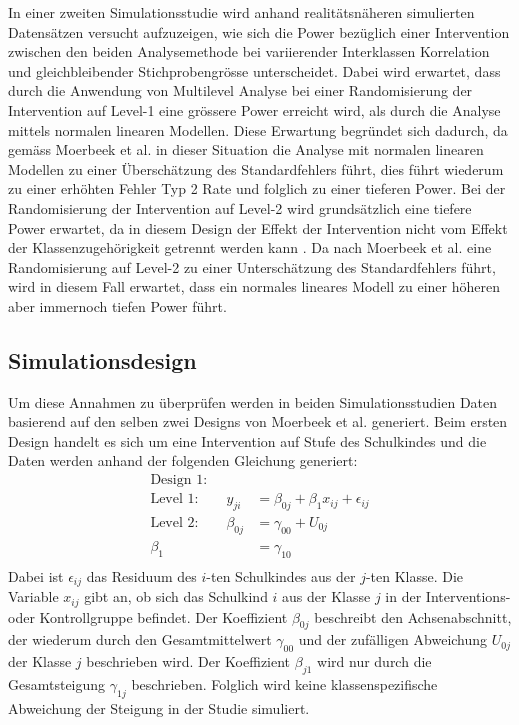 \documentclass[12pt]{article}\usepackage[]{graphicx}\usepackage[]{color}
\begin{document}
In einer zweiten Simulationsstudie wird anhand realitätsnäheren simulierten Datensätzen versucht aufzuzeigen, wie sich die Power bezüglich einer Intervention zwischen den beiden Analysemethode bei variierender Interklassen Korrelation und gleichbleibender Stichprobengrösse unterscheidet. Dabei wird erwartet, dass durch die Anwendung von Multilevel Analyse bei einer Randomisierung der Intervention auf Level-1 eine grössere Power erreicht wird, als durch die Analyse mittels normalen linearen Modellen. Diese Erwartung begründet sich dadurch, da gemäss Moerbeek et al. \citeyearpar{MOERBEEK2003341} in dieser Situation die Analyse mit normalen linearen Modellen zu einer Überschätzung des Standardfehlers führt, dies führt wiederum zu einer erhöhten Fehler Typ 2 Rate und folglich zu einer tieferen Power. Bei der Randomisierung der Intervention auf Level-2 wird grundsätzlich eine tiefere Power erwartet, da in diesem Design der Effekt der Intervention nicht vom Effekt der Klassenzugehörigkeit getrennt werden kann \citep{donnerbirkettbuck1981randomization, hsieh1988samplesize}. Da nach Moerbeek et al. \citeyearpar{MOERBEEK2003341} eine Randomisierung auf Level-2 zu einer Unterschätzung des Standardfehlers führt, wird in diesem Fall erwartet, dass ein normales lineares Modell zu einer höheren aber immernoch tiefen Power führt.  

\subsection{Simulationsdesign}
Um diese Annahmen zu überprüfen werden in beiden Simulationsstudien Daten basierend auf den selben zwei Designs von Moerbeek et al. \citeyearpar{MOERBEEK2003341} generiert. Beim ersten Design handelt es sich um eine Intervention auf Stufe des Schulkindes und die Daten werden anhand der folgenden Gleichung generiert:
\begin{equation} 
\begin{split}
\text{Design 1:}\\	
 \text{Level 1:}  \qquad y_{ji} & = \beta_{0j} + \beta_{1}x_{ij} + \epsilon_{ij}\\
 \text{Level 2:} \qquad \beta_{0j} & = \gamma_{00} + U_{0j}\\
 \beta_{1} & = \gamma_{10}\\
 \end{split}	
\end{equation} 
Dabei ist $\epsilon_{ij}$ das Residuum des $i$-ten Schulkindes aus der $j$-ten Klasse. Die Variable $x_{ij}$ gibt an, ob sich das Schulkind $i$ aus der Klasse $j$ in der Interventions- oder Kontrollgruppe befindet. Der Koeffizient $\beta_{0j}$ beschreibt den Achsenabschnitt, der wiederum durch den Gesamtmittelwert $\gamma_{00}$ und der zufälligen Abweichung $U_{0j}$ der Klasse $j$ beschrieben wird. Der Koeffizient $\beta_{j1}$ wird nur durch die Gesamtsteigung $\gamma_{1j}$ beschrieben. Folglich wird keine klassenspezifische Abweichung der Steigung in der Studie simuliert.
\end{document}
